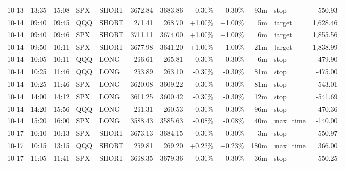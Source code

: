\documentclass[11pt,a4paper,twoside]{article}
\begin{document}
\begin{center}
\begin{longtable}{>{\color{txtmain}}l l l l l r r r r r >{\color{txtmain}}l r}
10-13 & 13:35 & 15:08 & SPX & SHORT & 3672.84 & 3683.86 & \textcolor{lossred}{-0.30\%} & \textcolor{lossred}{-0.30\%} & 93m & stop & \textcolor{lossred}{-550.93} \\
10-14 & 09:40 & 09:45 & QQQ & SHORT & 271.41 & 268.70 & \textcolor{wingreen}{+1.00\%} & \textcolor{wingreen}{+1.00\%} & 5m & target & \textcolor{wingreen}{1,628.46} \\
10-14 & 09:40 & 09:46 & SPX & SHORT & 3711.11 & 3674.00 & \textcolor{wingreen}{+1.00\%} & \textcolor{wingreen}{+1.00\%} & 6m & target & \textcolor{wingreen}{1,855.56} \\
10-14 & 09:50 & 10:11 & SPX & SHORT & 3677.98 & 3641.20 & \textcolor{wingreen}{+1.00\%} & \textcolor{wingreen}{+1.00\%} & 21m & target & \textcolor{wingreen}{1,838.99} \\
10-14 & 10:05 & 10:11 & QQQ & LONG & 266.61 & 265.81 & \textcolor{lossred}{-0.30\%} & \textcolor{lossred}{-0.30\%} & 6m & stop & \textcolor{lossred}{-479.90} \\
10-14 & 10:25 & 11:46 & QQQ & LONG & 263.89 & 263.10 & \textcolor{lossred}{-0.30\%} & \textcolor{lossred}{-0.30\%} & 81m & stop & \textcolor{lossred}{-475.00} \\
10-14 & 10:25 & 11:46 & SPX & LONG & 3620.08 & 3609.22 & \textcolor{lossred}{-0.30\%} & \textcolor{lossred}{-0.30\%} & 81m & stop & \textcolor{lossred}{-543.01} \\
10-14 & 14:00 & 14:12 & SPX & LONG & 3611.25 & 3600.42 & \textcolor{lossred}{-0.30\%} & \textcolor{lossred}{-0.30\%} & 12m & stop & \textcolor{lossred}{-541.69} \\
10-14 & 14:20 & 15:56 & QQQ & LONG & 261.31 & 260.53 & \textcolor{lossred}{-0.30\%} & \textcolor{lossred}{-0.30\%} & 96m & stop & \textcolor{lossred}{-470.36} \\
10-14 & 15:20 & 16:00 & SPX & LONG & 3588.43 & 3585.63 & \textcolor{lossred}{-0.08\%} & \textcolor{lossred}{-0.08\%} & 40m & max\_time & \textcolor{lossred}{-140.00} \\
10-17 & 10:10 & 10:13 & SPX & SHORT & 3673.13 & 3684.15 & \textcolor{lossred}{-0.30\%} & \textcolor{lossred}{-0.30\%} & 3m & stop & \textcolor{lossred}{-550.97} \\
10-17 & 10:15 & 13:15 & QQQ & SHORT & 269.81 & 269.20 & \textcolor{wingreen}{+0.23\%} & \textcolor{wingreen}{+0.23\%} & 180m & max\_time & \textcolor{wingreen}{366.00} \\
10-17 & 11:05 & 11:41 & SPX & SHORT & 3668.35 & 3679.36 & \textcolor{lossred}{-0.30\%} & \textcolor{lossred}{-0.30\%} & 36m & stop & \textcolor{lossred}{-550.25} \\

\end{longtable}
\end{center}
\end{document}
